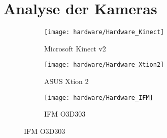 \documentclass[thesis.tex]{subfiles}
\begin{document}
\chapter{Analyse der Kameras}
\label{chap:analysis}

\begin{figure}[h!]
\centering
\begin{subfigure}{.32\textwidth}
    \centering
    \texttt{[image: hardware/Hardware\_Kinect]}
    \caption{Microsoft Kinect v2}
    \label{fig:Hardware_Kinect}
\end{subfigure}%
\begin{subfigure}{.32\textwidth}
    \centering
    \texttt{[image: hardware/Hardware\_Xtion2]}
    \caption{ASUS Xtion 2}
    \label{fig:Hardware_Xtion2}
\end{subfigure}
\begin{subfigure}{.32\textwidth}
    \centering
    \texttt{[image: hardware/Hardware\_IFM]}
    \caption{IFM O3D303}
    \label{fig:Hardware_IFM}
\end{subfigure}
\end{figure}
\end{document}
